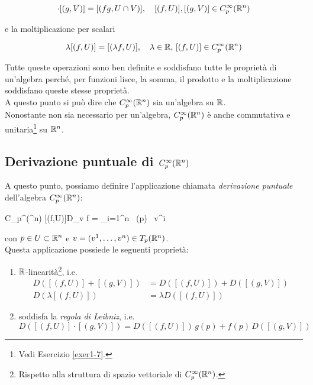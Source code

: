 \begin{equation}
	[(f,U)] \cdot [(g,V)] = [(f g,U \cap V)] \qcomma [(f,U)], [(g,V)] \in C_{p}^{\infty}(\R^{n})
\end{equation}

e la moltiplicazione per scalari

\begin{equation}
	\lambda [(f,U)] = [(\lambda f,U)] \qcomma \lambda \in \R, \, [(f,U)] \in C_{p}^{\infty}(\R^{n})
\end{equation}

Tutte queste operazioni sono ben definite e soddisfano tutte le proprietà di un'algebra perché, per funzioni lisce, la somma, il prodotto e la moltiplicazione soddisfano queste stesse proprietà. \\
A questo punto si può dire che $ C_{p}^{\infty}(\mathbb{R}^{n}) $ sia un'algebra su $ \mathbb{R} $. \\
Nonostante non sia necessario per un'algebra, $ C_{p}^{\infty}(\mathbb{R}^{n}) $ è anche commutativa e unitaria\footnote{%
	Vedi Esercizio \ref{exer1-7}.%
} su $ \mathbb{R}^{n} $.

\subsection{Derivazione puntuale di $ C_{p}^{\infty}(\mathbb{R}^{n}) $}

A questo punto, possiamo definire l'applicazione chiamata \textit{derivazione puntuale} dell'algebra $ C_{p}^{\infty}(\mathbb{R}^{n}) $:

	{C_{p}^{\infty}(\R^{n})}{\R}
	{[(f,U)]}{D_{v} f = \sum_{i=1}^{n}  \, (p) \, v^{i}}

con $ p \in U \subset \mathbb{R}^{n} $ e $ v = (v^{1}, \dots, v^{n}) \in T_{p} (\mathbb{R}^{n}) $. \\
Questa applicazione possiede le seguenti proprietà:

\begin{enumerate}
	\item $ \mathbb{R} $-linearità\footnote{%
		Rispetto alla struttura di spazio vettoriale di $ C_{p}^{\infty}(\mathbb{R}^{n}) $.%
	}, i.e.
		\begin{align}
			D ([(f,U)] + [(g,V)]) &= D ([(f,U)]) + D ([(g,V)]) \\
			D (\lambda [(f,U)]) &= \lambda D ([(f,U)])
		\end{align}
	
	\item soddisfa la \textit{regola di Leibniz}, i.e.
		\begin{equation}
			D ([(f,U)] \cdot [(g,V)]) = D ([(f,U)]) \, g(p) + f(p) \, D ([(g,V)])
		\end{equation}
\end{enumerate}

